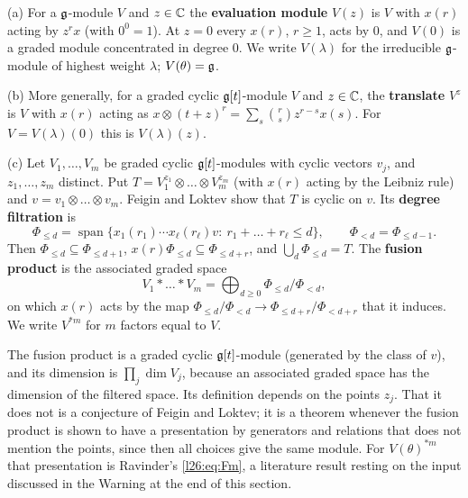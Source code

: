 \begin{definition}\label{l26:def:fusion}
(a) For a $\mathfrak g$-module $V$ and $z\in{\mathbb{C}}$ the \textbf{evaluation module} $V(z)$ is $V$ with $x(r)$ acting by $z^rx$
(with $0^0=1$). At $z=0$ every $x(r)$, $r\ge1$, acts by $0$, and $V(0)$ is a graded module concentrated in degree $0$.
We write $V(\lambda)$ for the irreducible $\mathfrak g$-module of highest weight $\lambda$; $V(\theta)=\mathfrak g$.

(b) More generally, for a graded cyclic $\mathfrak g[t]$-module $V$ and $z\in{\mathbb{C}}$, the \textbf{translate} $V^{z}$ is $V$ with
$x(r)$ acting as $x\otimes(t+z)^r=\sum_s\binom rs z^{r-s}x(s)$. For $V=V(\lambda)(0)$ this is $V(\lambda)(z)$.

(c) Let $V_1,\dots,V_m$ be graded cyclic $\mathfrak g[t]$-modules with cyclic vectors $v_j$, and $z_1,\dots,z_m$ distinct.
Put $T=V_1^{z_1}\otimes\dots\otimes V_m^{z_m}$ (with $x(r)$ acting by the Leibniz rule) and $v=v_1\otimes\dots\otimes v_m$.
Feigin and Loktev show that $T$ is cyclic on $v$. Its \textbf{degree filtration} is
\begin{equation*}
\Phi_{\le d}=\operatorname{span}\{x_1(r_1)\cdots x_\ell(r_\ell)v:\ r_1+\dots+r_\ell\le d\},\qquad \Phi_{<d}=\Phi_{\le d-1}.
\end{equation*}
Then $\Phi_{\le d}\subseteq\Phi_{\le d+1}$, $x(r)\Phi_{\le d}\subseteq\Phi_{\le d+r}$, and $\bigcup_d\Phi_{\le d}=T$. The
\textbf{fusion product} is the associated graded space
\begin{equation*}
V_1*\dots*V_m=\bigoplus_{d\ge0}\Phi_{\le d}/\Phi_{<d},
\end{equation*}
on which $x(r)$ acts by the map $\Phi_{\le d}/\Phi_{<d}\to\Phi_{\le d+r}/\Phi_{<d+r}$ that it induces. We write $V^{*m}$ for
$m$ factors equal to $V$.
\end{definition}

The fusion product is a graded cyclic $\mathfrak g[t]$-module (generated by the class of $v$), and its dimension is
$\prod_j\dim V_j$, because an associated graded space has the dimension of the filtered space. Its definition depends on the
points $z_j$. That it does not is a conjecture of Feigin and Loktev; it is a theorem whenever the fusion product is shown to
have a presentation by generators and relations that does not mention the points, since then all choices give the same
module. For $V(\theta)^{*m}$ that presentation is Ravinder's \eqref{l26:eq:Fm}, a literature result resting on the input
discussed in the Warning at the end of this section.

